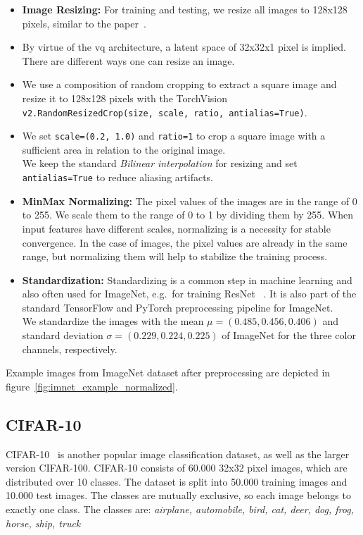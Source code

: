 \begin{itemize}
    \item \textbf{Image Resizing:}
    For training and testing, we resize all images to 128x128 pixels, similar to the paper~\cite{vqvae}.
    \item By virtue of the \ac{vq} architecture, a latent space of 32x32x1 pixel is implied.
    There are different ways one can resize an image.
    \item We use a composition of random cropping to extract a square image
    and resize it to 128x128 pixels with the TorchVision
    \texttt{v2.RandomResizedCrop(size, scale, ratio, antialias=True)}.
    \item We set \texttt{scale=(0.2, 1.0)} and \texttt{ratio=1} to crop a square image with a sufficient area in
    relation to the original image.\\
    We keep the standard \textit{Bilinear interpolation} for resizing and set \texttt{antialias=True}
    to reduce aliasing artifacts.

    \item \textbf{MinMax Normalizing:}
    The pixel values of the images are in the range of 0 to 255.
    We scale them to the range of 0 to 1 by dividing them by 255.
    When input features have different scales, normalizing is a necessity for stable convergence.
    In the case of images, the pixel values are already in the same range, but normalizing them will help to stabilize the training
    process.

    \item \textbf{Standardization:}
    Standardizing is a common step in machine learning and also often used for ImageNet, e.g.\ for training ResNet
    ~\cite{resnet}.
    It is also part of the standard TensorFlow and PyTorch preprocessing pipeline for ImageNet. \\
    We standardize the images with the mean $\mu = (0.485, 0.456, 0.406)$ and standard deviation
    $\sigma = (0.229, 0.224, 0.225)$ of ImageNet for the three color channels, respectively.

\end{itemize}

Example images from ImageNet dataset after preprocessing are depicted in figure~\ref{fig:imnet_example_normalized}.

\subsection{CIFAR-10}\label{subsec:cifar-10}
CIFAR-10~\cite{cifar10} is another popular image classification dataset, as well as the larger version CIFAR-100.
CIFAR-10 consists of 60.000
32x32 pixel images, which are distributed over 10 classes.
The dataset is split into 50.000 training images and 10.000 test images.
The classes are mutually exclusive, so each image belongs to exactly one class.
The classes are: \textit{airplane, automobile, bird, cat, deer, dog, frog, horse, ship, truck}


